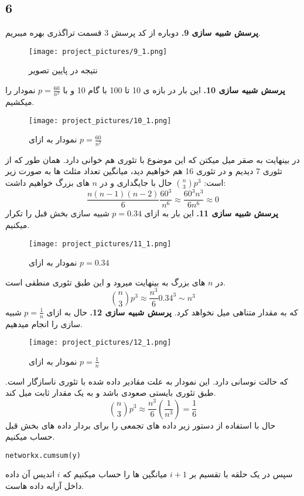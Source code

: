 \documentclass[11pt]{article}
\begin{document}
\begin{persian}
\section*{6}
\textbf{پرسش شبیه سازی 9.}
دوباره از کد پرسش 3 قسمت تراگذری بهره میبریم.
\begin{figure}[H]
\centerline{\texttt{[image: project\_pictures/9\_1.png]}}
\caption{نتیجه در پایین تصویر  }
\end{figure}
\textbf{پرسش شبیه سازی 10.}
این بار در بازه ی 10 تا 100 با گام 10 و با 
$p = \frac{60}{n^2}$
نمودار را میکشیم.
\begin{figure}[H]
\centerline{\texttt{[image: project\_pictures/10\_1.png]}}
\caption{نمودار به ازای $p=\frac{60}{n^2}$  }
\end{figure}
در بینهایت به صقر میل میکتن که این موضوع با تئوری هم خوانی دارد. همان طور که از تئوری 7 دیدیم و در تئوری 16 هم خواهیم دید، میانگین تعداد مثلث ها به صورت زیر است:
$
{ n \choose 3} p^3 
$
حال با جایگداری و در $n$ های بزرگ خواهیم داشت:
$$
\frac{n(n-1)(n-2)}{6} \frac{60^3}{n^6} \approx \frac{ 60^3n^3}{6n^6} \approx 0 
$$
\textbf{پرسش شبیه سازی 11.} 
این بار به ازای $p=0.34$ شبیه سازی بخش قبل را تکرار میکنیم.
\begin{figure}[H]
\centerline{\texttt{[image: project\_pictures/11\_1.png]}}
\caption{نمودار به ازای $p= 0.34$  }
\end{figure}
در $n$ های بزرگ به بینهایت میرود و این طبق تئوری منطقی است.
$$
{n \choose 3} p^3 \approx \frac{n^3}{6}0.34^3\sim n^3
$$
که به مقدار متناهی میل نخواهد کرد.
\newline
\textbf{پرسش شبیه سازی 12.} 
حال به ازای 
$p = \frac{1}{n}$
شبیه سازی را انجام میدهیم.
\begin{figure}[H]
\centerline{\texttt{[image: project\_pictures/12\_1.png]}}
\caption{نمودار به ازای $p= \frac{1}{n}$  }
\end{figure}
که حالت نوسانی دارد. این نمودار به علت مقادیر داده شده با تئوری ناسازگار است. طبق تئوری بایستی صعودی باشد و به یک مقدار ثابت میل کند.
$$
{n \choose 3} p^3 \approx \frac{n^3}{6}(\frac{1}{n^3}) = \frac{1}{6}
$$ 
حال با استفاده از دستور زیر داده های تجمعی را برای بردار داده های بخش قبل حساب میکنیم.
\begin{latin}
\lstset{language=python}
\begin{lstlisting}
networkx.cumsum(y)
\end{lstlisting}
\end{latin}
سپس در یک حلقه با تقسیم بر $i+1$ میانگین ها را حساب میکنیم که $i$ اندیس آن داده داخل آرایه داده هاست.
\begin{figure}[H]

\end{figure}
\end{persian}
\end{document}
